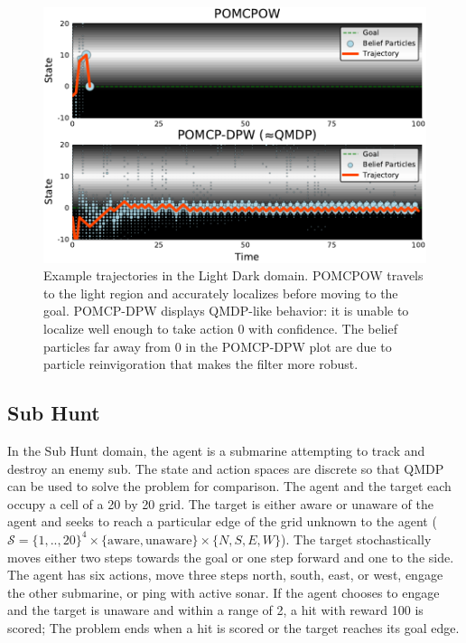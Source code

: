 \begin{figure}[htb]
    \centering
    \includegraphics[width=\columnwidth]{media/ld_fig.pdf}
    \caption{Example trajectories in the Light Dark domain. POMCPOW travels to the light region and accurately localizes before moving to the goal. POMCP-DPW displays QMDP-like behavior: it is unable to localize well enough to take action \num{0} with confidence. The belief particles far away from \num{0} in the POMCP-DPW plot are due to particle reinvigoration that makes the filter more robust.}
    \label{fig:ld}
\end{figure}

\subsection{Sub Hunt}

In the Sub Hunt domain, the agent is a submarine attempting to track and destroy an enemy sub.
The state and action spaces are discrete so that QMDP can be used to solve the problem for comparison.
The agent and the target each occupy a cell of a 20 by 20 grid. The target is either aware or unaware of the agent and seeks to reach a particular edge of the grid unknown to the agent ($\mathcal{S} = \{1,..,20\}^4 \times \{\text{aware}, \text{unaware}\} \times \{N,S,E,W\}$).
The target stochastically moves either two steps towards the goal or one step forward and one to the side.
The agent has six actions, move three steps north, south, east, or west, engage the other submarine, or ping with active sonar.
If the agent chooses to engage and the target is unaware and within a range of 2, a hit with reward 100 is scored; The problem ends when a hit is scored or the target reaches its goal edge.

